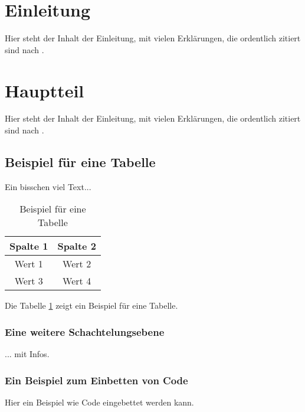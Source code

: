 \documentclass[12pt, a4paper, twoside]{article} %
\begin{document}
\newpage
\tableofcontents

\newpage
\listoffigures
\listoftables


\newpage
\section{Einleitung}
Hier steht der Inhalt der Einleitung, mit vielen Erklärungen, die ordentlich zitiert sind nach \cite[S. 25ff.]{example}.


\newpage
\section{Hauptteil}
Hier steht der Inhalt der Einleitung, mit vielen Erklärungen, die ordentlich zitiert sind nach \cite{bookexample}.


\subsection{Beispiel für eine Tabelle}

Ein bisschen viel Text... \lipsum[1]

\begin{table}[h]
\centering
\caption{Beispiel für eine Tabelle}
\label{tab:beispiel}
    \begin{tabular}{cc}
        \toprule
        Spalte 1 & Spalte 2 \\
        \midrule
        Wert 1 & Wert 2 \\
        Wert 3 & Wert 4 \\
        \bottomrule
    \end{tabular}
\end{table}

Die Tabelle \ref{tab:beispiel} zeigt ein Beispiel für eine Tabelle. \lipsum[1]


\subsubsection{Eine weitere Schachtelungsebene}
... mit Infos.


\subsubsection{Ein Beispiel zum Einbetten von Code}
Hier ein Beispiel wie Code eingebettet werden kann.
\end{document}
